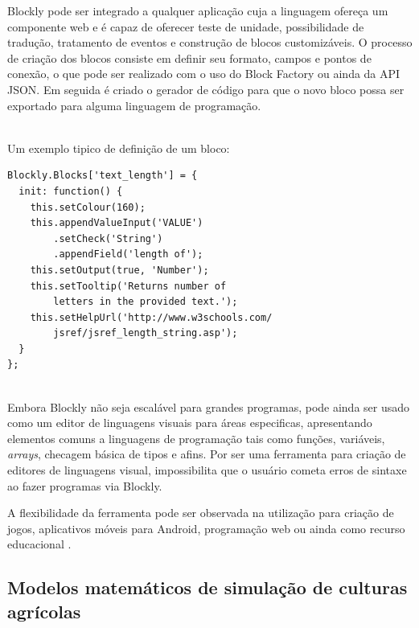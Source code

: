 \documentclass[tg]{mdtufsm}
\begin{document}
	Blockly pode ser integrado a qualquer aplicação cuja a linguagem ofereça um componente web e é capaz de oferecer teste de unidade, possibilidade de tradução, tratamento de eventos e construção de blocos customizáveis. O processo de criação dos blocos consiste em definir seu formato, campos e pontos de conexão, o que pode ser realizado com o uso do Block Factory ou ainda da API JSON.
	Em seguida é criado o gerador de código para que o novo bloco possa ser exportado para alguma linguagem de programação.

	~\\
	Um exemplo tipico de definição de um bloco:


	\begin{lstlisting}[frame=single]
Blockly.Blocks['text_length'] = {
  init: function() {
	this.setColour(160);
	this.appendValueInput('VALUE')
		.setCheck('String')
		.appendField('length of');
	this.setOutput(true, 'Number');
	this.setTooltip('Returns number of
		letters in the provided text.');
	this.setHelpUrl('http://www.w3schools.com/
		jsref/jsref_length_string.asp');
  }
};
    \end{lstlisting}

	~\\
	Embora Blockly não seja escalável para grandes programas, pode ainda ser usado como um editor de linguagens visuais para áreas especificas, apresentando elementos comuns a linguagens de programação tais como funções, variáveis, \emph{arrays}, checagem básica de tipos e afins. Por ser uma ferramenta para criação de editores de linguagens visual, impossibilita que o usuário cometa erros de sintaxe ao fazer programas via Blockly.


	A flexibilidade da ferramenta pode ser observada na utilização para criação de jogos, aplicativos móveis para Android, programação web ou ainda como recurso educacional \cite{blocklyGames,blocklymobile,blocklyJavaScript,blocklyEducation}.

	\subsection{Modelos matemáticos de simulação de culturas agrícolas}
\end{document}

